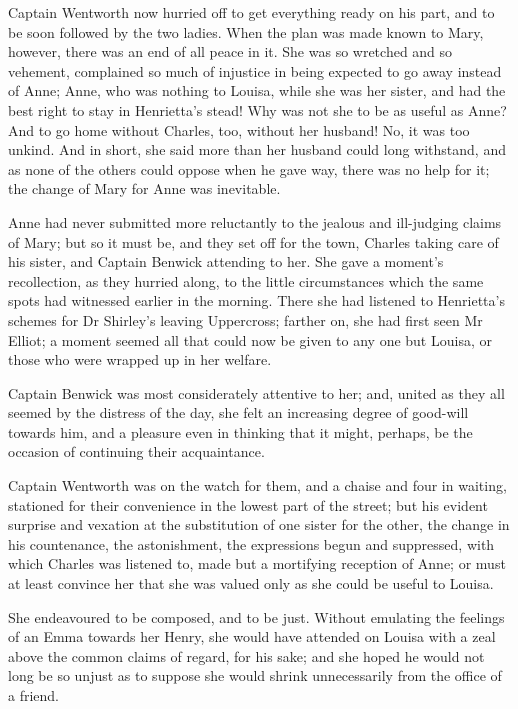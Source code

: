 Captain Wentworth now hurried off to get everything ready on his part, and to be soon followed by the two ladies. When the plan was made known to Mary, however, there was an end of all peace in it. She was so wretched and so vehement, complained so much of injustice in being expected to go away instead of Anne; Anne, who was nothing to Louisa, while she was her sister, and had the best right to stay in Henrietta's stead! Why was not she to be as useful as Anne? And to go home without Charles, too, without her husband! No, it was too unkind. And in short, she said more than her husband could long withstand, and as none of the others could oppose when he gave way, there was no help for it; the change of Mary for Anne was inevitable.

Anne had never submitted more reluctantly to the jealous and ill-judging claims of Mary; but so it must be, and they set off for the town, Charles taking care of his sister, and Captain Benwick attending to her. She gave a moment's recollection, as they hurried along, to the little circumstances which the same spots had witnessed earlier in the morning. There she had listened to Henrietta's schemes for Dr Shirley's leaving Uppercross; farther on, she had first seen Mr Elliot; a moment seemed all that could now be given to any one but Louisa, or those who were wrapped up in her welfare.

Captain Benwick was most considerately attentive to her; and, united as they all seemed by the distress of the day, she felt an increasing degree of good-will towards him, and a pleasure even in thinking that it might, perhaps, be the occasion of continuing their acquaintance.

Captain Wentworth was on the watch for them, and a chaise and four in waiting, stationed for their convenience in the lowest part of the street; but his evident surprise and vexation at the substitution of one sister for the other, the change in his countenance, the astonishment, the expressions begun and suppressed, with which Charles was listened to, made but a mortifying reception of Anne; or must at least convince her that she was valued only as she could be useful to Louisa.

She endeavoured to be composed, and to be just. Without emulating the feelings of an Emma towards her Henry, she would have attended on Louisa with a zeal above the common claims of regard, for his sake; and she hoped he would not long be so unjust as to suppose she would shrink unnecessarily from the office of a friend.

